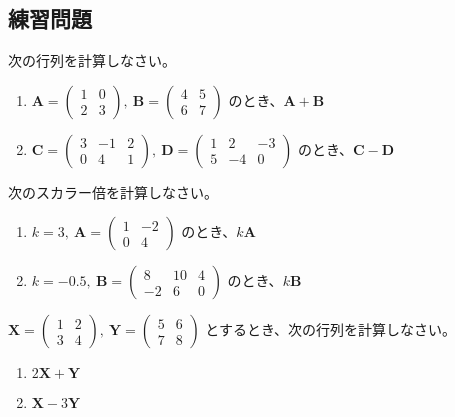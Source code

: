 \subsection{練習問題}

\begin{quiz}
次の行列を計算しなさい。
\begin{enumerate}
\item $\bm{A} = \begin{pmatrix} 1 & 0 \\ 2 & 3 \end{pmatrix},\ \bm{B} = \begin{pmatrix} 4 & 5 \\ 6 & 7 \end{pmatrix}$ のとき、$\bm{A} + \bm{B}$
\item $\bm{C} = \begin{pmatrix} 3 & -1 & 2 \\ 0 & 4 & 1 \end{pmatrix},\ \bm{D} = \begin{pmatrix} 1 & 2 & -3 \\ 5 & -4 & 0 \end{pmatrix}$ のとき、$\bm{C} - \bm{D}$
\end{enumerate}
\end{quiz}

\begin{quiz}
次のスカラー倍を計算しなさい。
\begin{enumerate}
\item $k = 3,\ \bm{A} = \begin{pmatrix} 1 & -2 \\ 0 & 4 \end{pmatrix}$ のとき、$k\bm{A}$
\item $k = -0.5,\ \bm{B} = \begin{pmatrix} 8 & 10 & 4 \\ -2 & 6 & 0 \end{pmatrix}$ のとき、$k\bm{B}$
\end{enumerate}
\end{quiz}

\begin{quiz}
$\bm{X} = \begin{pmatrix} 1 & 2 \\ 3 & 4 \end{pmatrix},\ \bm{Y} = \begin{pmatrix} 5 & 6 \\ 7 & 8 \end{pmatrix}$ とするとき、次の行列を計算しなさい。
\begin{enumerate}
\item $2\bm{X} + \bm{Y}$
\item $\bm{X} - 3\bm{Y}$
\end{enumerate}
\end{quiz}

